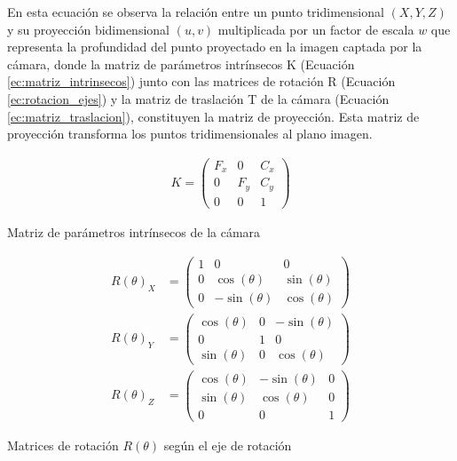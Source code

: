 En esta ecuación se observa la relación entre un punto tridimensional \((X, Y, Z)\) y su proyección bidimensional \((u, v)\) multiplicada por un factor de escala \(w\) que representa la profundidad del punto proyectado en la imagen captada por la cámara, donde la matriz de parámetros intrínsecos K (Ecuación \ref{ec:matriz_intrinsecos}) junto con las matrices de rotación R (Ecuación \ref{ec:rotacion_ejes}) y la matriz de traslación T de la cámara (Ecuación \ref{ec:matriz_traslacion}), constituyen la matriz de proyección. Esta matriz de proyección transforma los puntos tridimensionales al plano imagen. 

  \begin{myequation}[H]
    \begin{align}
      K = 
      \begin{pmatrix}
        F_x & 0   & C_x \\
        0   & F_y & C_y \\
        0   & 0   & 1
      \end{pmatrix}
      \nonumber
    \end{align}
    \caption{Matriz de parámetros intrínsecos de la cámara}
    \label{ec:matriz_intrinsecos}
  \end{myequation}

  \begin{myequation}[H]
    \begin{align*}
      R(\theta)_X &= 
      \begin{pmatrix}
        1 & 0 & 0 \\
        0 & \cos(\theta) & \sin(\theta) \\
        0 & -\sin(\theta) & \cos(\theta)
      \end{pmatrix} \\[2ex]
      \nonumber
      R(\theta)_Y &= 
      \begin{pmatrix}
        \cos(\theta) & 0 & -\sin(\theta) \\
        0 & 1 & 0 \\
        \sin(\theta) & 0 & \cos(\theta)
      \end{pmatrix} \\[2ex]
      \nonumber
      R(\theta)_Z &= 
      \begin{pmatrix}
        \cos(\theta) & -\sin(\theta) & 0 \\
        \sin(\theta) & \cos(\theta) & 0 \\
        0 & 0 & 1
        \nonumber
      \end{pmatrix}
    \end{align*}
    \caption{Matrices de rotación \( R(\theta) \) según el eje de rotación}
    \label{ec:rotacion_ejes}
  \end{myequation}


